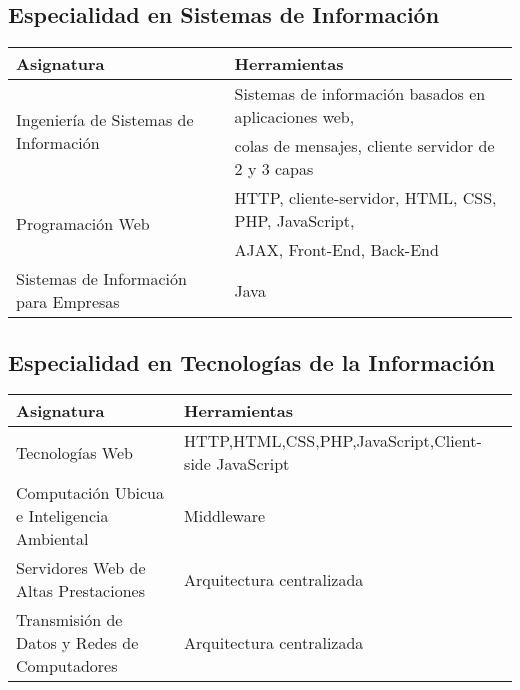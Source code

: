 \subsection{Especialidad en Sistemas de Información}

\begin{center}
	\begin{tabular}{l|l}
		\textbf{Asignatura}                                    & \textbf{Herramientas} \\ \hline
		\multirow{2}{*}{Ingeniería de Sistemas de Información} & Sistemas de información basados en aplicaciones web, \\
		                                                       & colas de mensajes, cliente servidor de 2 y 3 capas \\  \hline
		\multirow{2}{*}{Programación Web}                      & HTTP, cliente-servidor, HTML, CSS, PHP, JavaScript, \\
		                                                       & AJAX, Front-End, Back-End                           \\  \hline
		Sistemas de Información para Empresas                  & Java
	\end{tabular}
\end{center}

\subsection{Especialidad en Tecnologías de la Información}

\begin{center}
	\begin{tabular}{l|l}
		\textbf{Asignatura}                          & \textbf{Herramientas} \\ \hline
		Tecnologías Web                              & HTTP,HTML,CSS,PHP,JavaScript,Client-side JavaScript \\  \hline
		Computación Ubicua e Inteligencia Ambiental  & Middleware \\  \hline
		Servidores Web de Altas Prestaciones         & Arquitectura centralizada \\  \hline
		Transmisión de Datos y Redes de Computadores & Arquitectura centralizada
	\end{tabular}
\end{center}
